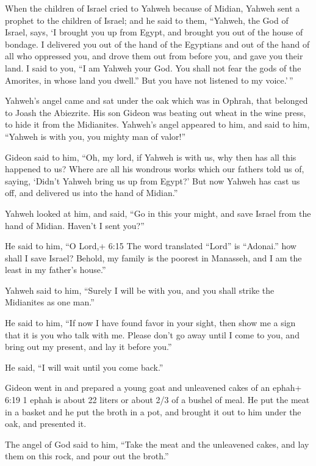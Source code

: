  When the children of Israel cried to Yahweh because of
Midian,  Yahweh sent a prophet to the children of Israel;
and he said to them, ``Yahweh, the God of Israel, says, `I brought you
up from Egypt, and brought you out of the house of bondage. 
I delivered you out of the hand of the Egyptians and out of the hand of
all who oppressed you, and drove them out from before you, and gave you
their land.  I said to you, ``I am Yahweh your God. You
shall not fear the gods of the Amorites, in whose land you dwell.'' But
you have not listened to my voice.'\,''

 Yahweh's angel came and sat under the oak which was in
Ophrah, that belonged to Joash the Abiezrite. His son Gideon was beating
out wheat in the wine press, to hide it from the Midianites.
 Yahweh's angel appeared to him, and said to him, ``Yahweh
is with you, you mighty man of valor!''

 Gideon said to him, ``Oh, my lord, if Yahweh is with us,
why then has all this happened to us? Where are all his wondrous works
which our fathers told us of, saying, `Didn't Yahweh bring us up from
Egypt?' But now Yahweh has cast us off, and delivered us into the hand
of Midian.''

 Yahweh looked at him, and said, ``Go in this your might,
and save Israel from the hand of Midian. Haven't I sent you?''

 He said to him, ``O Lord,+ 6:15 The word translated
``Lord'' is ``Adonai.'' how shall I save Israel? Behold, my family is
the poorest in Manasseh, and I am the least in my father's house.''

 Yahweh said to him, ``Surely I will be with you, and you
shall strike the Midianites as one man.''

 He said to him, ``If now I have found favor in your sight,
then show me a sign that it is you who talk with me. 
Please don't go away until I come to you, and bring out my present, and
lay it before you.''

He said, ``I will wait until you come back.''

 Gideon went in and prepared a young goat and unleavened
cakes of an ephah+ 6:19 1 ephah is about 22 liters or about 2/3 of a
bushel of meal. He put the meat in a basket and he put the broth in a
pot, and brought it out to him under the oak, and presented it.

 The angel of God said to him, ``Take the meat and the
unleavened cakes, and lay them on this rock, and pour out the broth.''

